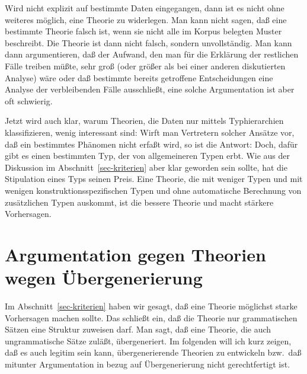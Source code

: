 Wird nicht explizit auf bestimmte Daten eingegangen, dann ist es nicht ohne weiteres möglich,
eine Theorie zu widerlegen. Man kann \zb nicht sagen, daß eine bestimmte Theorie %
falsch ist, wenn sie nicht alle im Korpus belegten Muster %
beschreibt. Die Theorie ist dann nicht falsch, sondern unvollständig. Man kann dann argumentieren,
daß der Aufwand, den man für die Erklärung der restlichen Fälle treiben müßte, sehr groß (oder größer als bei einer
anderen diskutierten Analyse) wäre oder daß bestimmte bereits getroffene Entscheidungen eine Analyse der verbleibenden Fälle ausschließt,
eine solche Argumentation ist aber oft schwierig. 

Jetzt wird auch klar, warum Theorien, die Daten nur mittels Typhierarchien klassifizieren,
wenig interessant sind: Wirft man Vertretern solcher Ansätze vor, daß ein bestimmtes Phänomen
nicht erfaßt wird, so ist die Antwort: Doch, dafür gibt es einen bestimmten Typ, der von allgemeineren
Typen erbt. Wie aus der Diskussion im Abschnitt~\ref{sec-kriterien} aber klar geworden sein sollte,
hat die Stipulation eines Typs seinen Preis. Eine Theorie, die mit weniger Typen und mit wenigen
konstruktionsspezifischen Typen und ohne automatische Berechnung von zusätzlichen Typen
auskommt, ist die bessere Theorie und macht stärkere Vorhersagen.






\section{Argumentation gegen Theorien wegen Übergenerierung}

Im Abschnitt~\ref{sec-kriterien} haben wir gesagt, daß eine Theorie möglichst starke Vorhersagen
machen sollte. Das schließt ein, daß die Theorie nur grammatischen Sätzen eine Struktur zuweisen
darf. Man sagt, daß eine Theorie, die auch ungrammatische Sätze zuläßt, übergeneriert. Im folgenden
will ich kurz zeigen, daß es auch legitim sein kann, übergenerierende Theorien zu entwickeln bzw.\
daß mitunter Argumentation in bezug auf Übergenerierung nicht gerechtfertigt ist.

